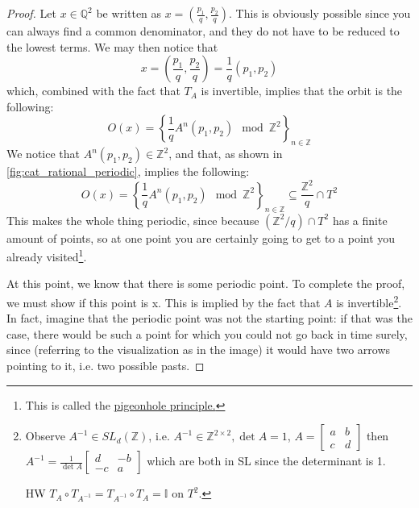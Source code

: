 \begin{proof}
    Let $x\in\mathbb{Q}^2$ be written as $x=(\frac{p_1}{q}, \frac{p_2}{q})$. This is obviously possible since you can always find a common denominator, and they do not have to be reduced to the lowest terms. We may then notice that \begin{equation*}
        x=\left(\frac{p_1}{q}, \frac{p_2}{q}\right)=\frac{1}{q}(p_1, p_2)
    \end{equation*}
    which, combined with the fact that $T_A$ is invertible, implies that the orbit is the following: \begin{equation*}
        O(x)=\left\{\frac{1}{q}A^n(p_1, p_2) \mod \mathbb{Z}^2\right\}_{n\in\mathbb{Z}}
    \end{equation*}
    We notice that $A^n(p_1, p_2)\in\mathbb{Z}^2$, and that, as shown in \autoref{fig:cat_rational_periodic}, implies the following:
    \begin{equation*}
        O(x)=\left\{\frac{1}{q}A^n(p_1, p_2) \mod \mathbb{Z}^2\right\}_{n\in\mathbb{Z}}\subseteq \frac{\mathbb{Z}^2}{q}\cap T^2
    \end{equation*}
    This makes the whole thing periodic, since because $(\mathbb{Z}^2/q)\cap T^2$ has a finite amount of points, so at one point you are certainly going to get to a point you already visited\footnote{This is called the \href{https://en.wikipedia.org/wiki/Pigeonhole_principle}{pigeonhole principle.}}. 
    
    At this point, we know that there is some periodic point. To complete the proof, we must show if this point is x. This is implied by the fact that $A$ is invertible\footnote{Observe $A^{-1}\in SL_d(\mathbb{Z})$, i.e. $A^{-1}\in\mathbb{Z}^{2\times2}, \det A=1$, $A=\begin{bmatrix}
        a & b \\ c & d
    \end{bmatrix}$ then $A^{-1}=\frac{1}{\det A}\begin{bmatrix}
        d & -b \\ -c & a
    \end{bmatrix}$ which are both in SL since the determinant is 1. 

    HW $T_A\circ T_{A^{-1}}=T_{A^{-1}}\circ T_{A}=\mathbb{I}$ on $T^2$. }.  In fact, imagine that the periodic point was not the starting point: if that was the case, there would be such a point for which you could not go back in time surely, since (referring to the visualization as in the image) it would have two arrows pointing to it, i.e. two possible pasts.


\end{proof}
